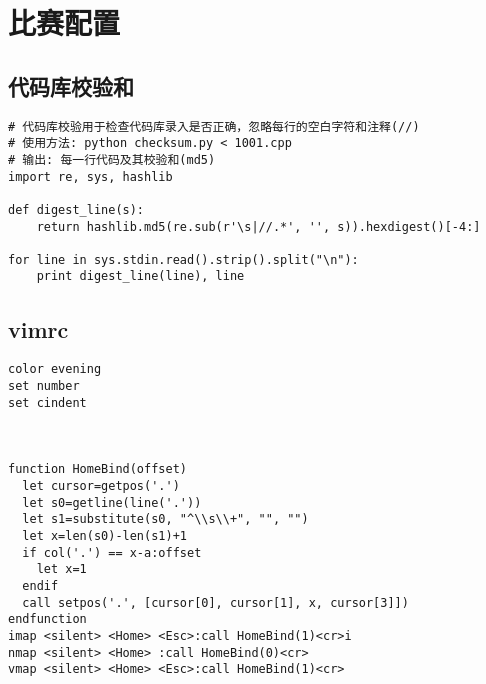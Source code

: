 \section{比赛配置}
\subsection{代码库校验和}
\begin{lstlisting}[language={}]
# 代码库校验用于检查代码库录入是否正确，忽略每行的空白字符和注释(//)
# 使用方法: python checksum.py < 1001.cpp
# 输出: 每一行代码及其校验和(md5)
import re, sys, hashlib

def digest_line(s):
	return hashlib.md5(re.sub(r'\s|//.*', '', s)).hexdigest()[-4:]

for line in sys.stdin.read().strip().split("\n"):
	print digest_line(line), line
\end{lstlisting}
\subsection{vimrc}
\begin{lstlisting}[language={}]
color evening
set number
set cindent



function HomeBind(offset)
  let cursor=getpos('.')
  let s0=getline(line('.'))
  let s1=substitute(s0, "^\\s\\+", "", "")
  let x=len(s0)-len(s1)+1
  if col('.') == x-a:offset
    let x=1
  endif
  call setpos('.', [cursor[0], cursor[1], x, cursor[3]])
endfunction
imap <silent> <Home> <Esc>:call HomeBind(1)<cr>i
nmap <silent> <Home> :call HomeBind(0)<cr>
vmap <silent> <Home> <Esc>:call HomeBind(1)<cr>
\end{lstlisting}
